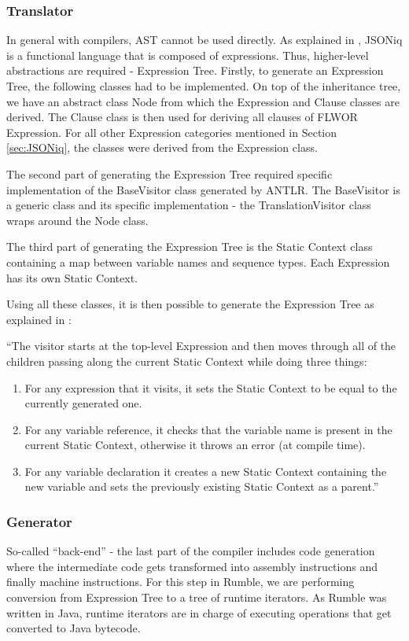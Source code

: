 \subsubsection{Translator}
In general with compilers, AST cannot be used directly. As explained in \cite{RumbleMLThesis}, JSONiq is a functional language that is composed of expressions. Thus, higher-level abstractions are required - Expression Tree. Firstly, to generate an Expression Tree, the following classes had to be implemented. On top of the inheritance tree, we have an abstract class Node from which the Expression and Clause classes are derived. The Clause class is then used for deriving all clauses of FLWOR Expression. For all other Expression categories mentioned in Section \ref{sec:JSONiq}, the classes were derived from the Expression class. 

The second part of generating the Expression Tree required specific implementation of the BaseVisitor class generated by ANTLR. The BaseVisitor is a generic class and its specific implementation - the TranslationVisitor class wraps around the Node class. 

The third part of generating the Expression Tree is the Static Context class containing a map between variable names and sequence types. Each Expression has its own Static Context.

Using all these classes, it is then possible to generate the Expression Tree as explained in \cite{RumbleThesis}: 

``The visitor starts at the top-level Expression and then moves through all of the children passing along the current Static Context while doing three things:
\begin{enumerate}
	\item For any expression that it visits, it sets the Static Context to be equal to the currently generated one.
	\item For any variable reference, it checks that the variable name is present in the current Static Context, otherwise it throws an error (at compile time).
	\item For any variable declaration it creates a new Static Context containing the new variable and sets the previously existing Static Context as a parent.''
\end{enumerate}

\subsubsection{Generator}
\label{sec:Generator}
So-called ``back-end'' - the last part of the compiler includes code generation where the intermediate code gets transformed into assembly instructions and finally machine instructions. For this step in Rumble, we are performing conversion from Expression Tree to a tree of runtime iterators. As Rumble was written in Java, runtime iterators are in charge of executing operations that get converted to Java bytecode.

